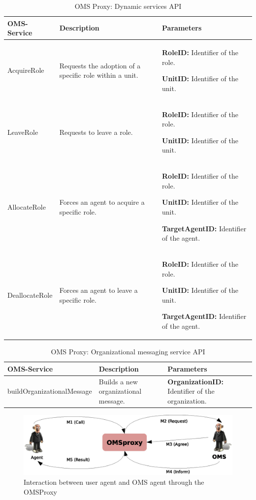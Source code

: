 \begin{table}[h!t]
\begin{tabular}{|l|p{5cm}|p{5cm}|}
\hline
OMS-Service & Description & Parameters \\ \hline
AcquireRole & Requests the adoption of a specific role within a unit.
 &

\textbf{RoleID:} Identifier of the role. 

\textbf{
UnitID:} Identifier of the unit. 

\\ \hline
LeaveRole & Requests to leave a role.
&

\textbf{RoleID:} Identifier of the role. 

\textbf{UnitID:} Identifier of the unit. 

\\ \hline

AllocateRole & Forces an agent to acquire a specific role.
 & 

\textbf{RoleID:} Identifier of the role. 

\textbf{UnitID:} Identifier of the unit. 

\textbf{TargetAgentID:} Identifier of the agent.
 \\ \hline

DeallocateRole & Forces an agent to leave a specific role.
 & 

\textbf{RoleID:} Identifier of the role. 

\textbf{UnitID:} Identifier of the unit. 

\textbf{TargetAgentID:} Identifier of the agent.
 \\ \hline
\end{tabular}
\caption{OMS Proxy: Dynamic services API}
\label{tab:thomas_OMSProxy_compound}
\end{table}


\begin{table}[h!t]
\begin{tabular}{|l|p{3cm}|p{5cm}|}
\hline
OMS-Service & Description & Parameters \\ \hline
buildOrganizationalMessage & Builds a new organizational message.
 &
\textbf{OrganizationID:} Identifier of the organization. 
 \\ \hline
\end{tabular}
\caption{OMS Proxy: Organizational messaging service API}
\label{tab:thomas_OMSProxy_messaging}
\end{table}


\begin{figure}[h!t]
	\centering
	\includegraphics[width=1.0\textwidth]{Thomas/images/oms_omsProxy_interaction}
	\caption{Interaction between user agent and OMS agent through the OMSProxy}
\end{figure}


